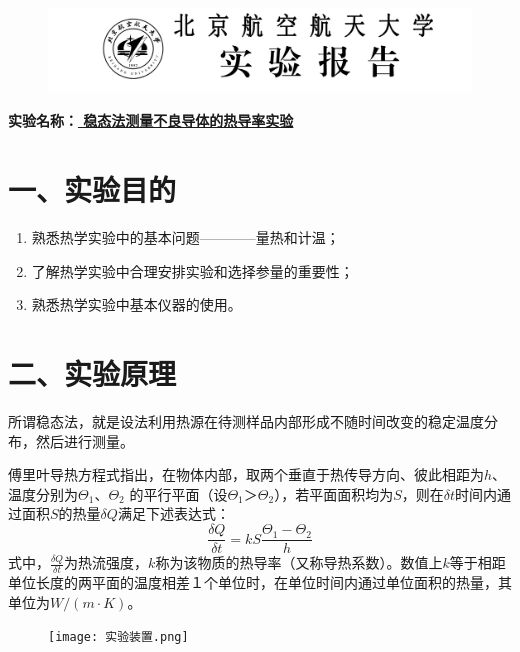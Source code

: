 \documentclass[11pt,a4paper,oneside]{article}
\begin{document}
\begin{figure}[H]
 \centering
  \includegraphics[width=13cm]{Image/表头.png}
\end{figure}
\begin{center}
\textbf{{\large 实验名称：\uline{         稳态法测量不良导体的热导率实验      }}}
\end{center}

\section*{一、实验目的}
\begin{enumerate}
\item 熟悉热学实验中的基本问题————量热和计温；
\item 了解热学实验中合理安排实验和选择参量的重要性；
\item 熟悉热学实验中基本仪器的使用。
\end{enumerate}

\section*{二、实验原理}
所谓稳态法，就是设法利用热源在待测样品内部形成不随时间改变的稳定温度分布，然后进行测量。

傅里叶导热方程式指出，在物体内部，取两个垂直于热传导方向、彼此相距为$h$、温度分别为$\Theta _1$、$\Theta _2$ 的平行平面（设$\Theta _1$＞$\Theta _2$），若平面面积均为$S$，则在$\delta t$时间内通过面积$S$的热量$\delta Q$满足下述表达式：
$$ \displaystyle\frac{\delta Q}{\delta t}=kS\displaystyle\frac{\Theta _1-\Theta _2}{h} $$
式中，$ \displaystyle\frac{\delta Q}{\delta t}$为热流强度，$k$称为该物质的热导率（又称导热系数）。数值上$k$等于相距单位长度的两平面的温度相差１个单位时，在单位时间内通过单位面积的热量，其单位为$ W/(m\cdot K)$。

\begin{figure}
  \vspace{-20pt}
  \begin{center}
    \texttt{[image: 实验装置.png]}
  \end{center}
  \vspace{-20pt}
  \vspace{-10pt}
\end{figure}
\end{document}
